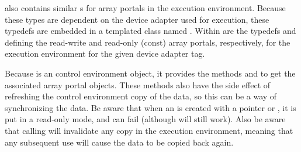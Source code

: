 also contains similar s for array
portals in the execution environment. Because these types are dependent on
the device adapter used for execution, these typedefs are embedded in a
templated class named . 
Within  are the typedefs  and
 defining the read-write and read-only (const) array
portals, respectively, for the execution environment for the given device
adapter tag.

Because  is an control environment object, it
provides the methods  
and   to get
the associated array portal objects. These methods also have the side
effect of refreshing the control environment copy of the data, so this can
be a way of synchronizing the data. Be aware that when an
 is created with a pointer or ,
it is put in a read-only mode, and  can fail
(although  will still work). Also be aware
that calling  will invalidate any copy in the
execution environment, meaning that any subsequent use will cause the data
to be copied back again.






